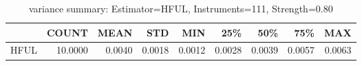\begin{table}[ht]
\centering
\caption{variance summary: Estimator=HFUL, Instruments=111, Strength=0.80}
\begin{tabular}{lrrrrrrrr}
\toprule
 & COUNT & MEAN & STD & MIN & 25\% & 50\% & 75\% & MAX \\
\midrule
HFUL & 10.0000 & 0.0040 & 0.0018 & 0.0012 & 0.0028 & 0.0039 & 0.0057 & 0.0063 \\
\bottomrule
\end{tabular}
\end{table}
